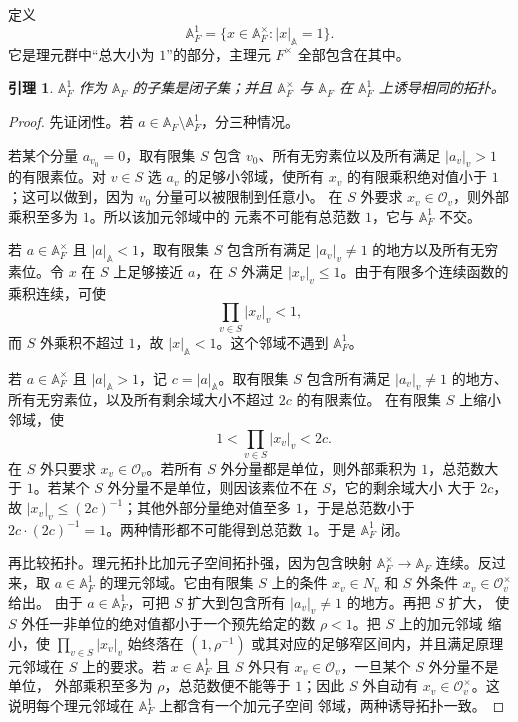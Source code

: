 \documentclass[11pt,a4paper,openany]{ctexbook}
\numberwithin{equation}{chapter}
\newcommand{\A}{\mathbb{A}}
\theoremstyle{plain}
\newtheorem{lemma}[theorem]{引理}
\theoremstyle{definition}
\theoremstyle{remark}
\begin{document}
定义
\[
 \A_F^1=\{x\in\A_F^\times: |x|_\A=1\}.
\]
它是理元群中“总大小为 $1$”的部分，主理元 $F^\times$ 全部包含在其中。

\begin{lemma}
$\A_F^1$ 作为 $\A_F$ 的子集是闭子集；并且 $\A_F^\times$ 与 $\A_F$ 在 $\A_F^1$ 上诱导相同的拓扑。
\end{lemma}

\begin{proof}
先证闭性。若 $a\in\A_F\setminus\A_F^1$，分三种情况。

若某个分量 $a_{v_0}=0$，取有限集 $S$ 包含 $v_0$、所有无穷素位以及所有满足
 $|a_v|_v>1$ 的有限素位。对 $v\in S$ 选 $a_v$ 的足够小邻域，使所有
$x_v$ 的有限乘积绝对值小于 $1$；这可以做到，因为 $v_0$ 分量可以被限制到任意小。
在 $S$ 外要求 $x_v\in\mathcal O_v$，则外部乘积至多为 $1$。所以该加元邻域中的
元素不可能有总范数 $1$，它与 $\A_F^1$ 不交。

若 $a\in\A_F^\times$ 且 $|a|_\A<1$，取有限集 $S$ 包含所有满足 $|a_v|_v\ne1$ 的地方以及所有无穷素位。令 $x$ 在 $S$ 上足够接近 $a$，在 $S$ 外满足 $|x_v|_v\le1$。由于有限多个连续函数的乘积连续，可使
\[
 \prod_{v\in S}|x_v|_v<1,
\]
而 $S$ 外乘积不超过 $1$，故 $|x|_\A<1$。这个邻域不遇到 $\A_F^1$。

若 $a\in\A_F^\times$ 且 $|a|_\A>1$，记 $c=|a|_\A$。取有限集 $S$ 包含所有满足
$|a_v|_v\ne1$ 的地方、所有无穷素位，以及所有剩余域大小不超过 $2c$ 的有限素位。
在有限集 $S$ 上缩小邻域，使
\[
\qquad 1<\prod_{v\in S}|x_v|_v<2c .
\]
在 $S$ 外只要求 $x_v\in\mathcal O_v$。若所有 $S$ 外分量都是单位，则外部乘积为
$1$，总范数大于 $1$。若某个 $S$ 外分量不是单位，则因该素位不在 $S$，它的剩余域大小
大于 $2c$，故 $|x_v|_v\le(2c)^{-1}$；其他外部分量绝对值至多 $1$，于是总范数小于
$2c\cdot(2c)^{-1}=1$。两种情形都不可能得到总范数 $1$。于是 $\A_F^1$ 闭。

再比较拓扑。理元拓扑比加元子空间拓扑强，因为包含映射
$\A_F^\times\to\A_F$ 连续。反过来，取 $a\in\A_F^1$ 的理元邻域。它由有限集
$S$ 上的条件 $x_v\in N_v$ 和 $S$ 外条件 $x_v\in\mathcal O_v^\times$ 给出。
由于 $a\in\A_F^1$，可把 $S$ 扩大到包含所有 $|a_v|_v\ne1$ 的地方。再把 $S$ 扩大，
使 $S$ 外任一非单位的绝对值都小于一个预先给定的数 $\rho<1$。把 $S$ 上的加元邻域
缩小，使 $\prod_{v\in S}|x_v|_v$ 始终落在
$(1,\rho^{-1})$ 或其对应的足够窄区间内，并且满足原理元邻域在 $S$ 上的要求。若
$x\in\A_F^1$ 且 $S$ 外只有 $x_v\in\mathcal O_v$，一旦某个 $S$ 外分量不是单位，
外部乘积至多为 $\rho$，总范数便不能等于 $1$；因此 $S$ 外自动有
$x_v\in\mathcal O_v^\times$。这说明每个理元邻域在 $\A_F^1$ 上都含有一个加元子空间
邻域，两种诱导拓扑一致。
\end{proof}
\end{document}
